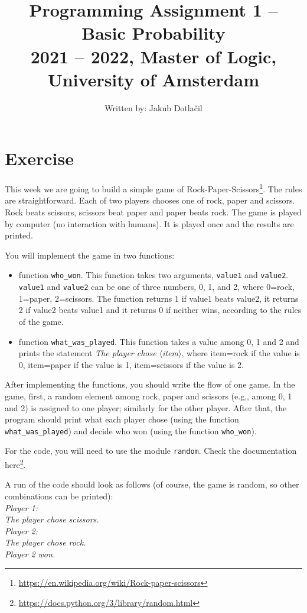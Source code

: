 \documentclass[11pt, a4paper]{article}
\title{Programming Assignment 1 -- Basic Probability\\[2mm]
\large{2021 -- 2022, Master of Logic, University of Amsterdam}}
\author{Written by: Jakub Dotla\v{c}il \\}
\newcommand{\angles}[1]{$\langle$#1$\rangle$}
\newcommand{\link}[1]{\footnote{\color{blue}\href{#1}{#1}}}
\begin{document}
\date{}\maketitle

\section{Exercise}
This week we are going to build a simple game of Rock-Paper-Scissors\link{https://en.wikipedia.org/wiki/Rock-paper-scissors}. The rules are straightforward. Each of two players chooses one of rock, paper and scissors. Rock beats scissors, scissors beat paper and paper beats rock. The game is played by computer (no interaction with humans). It is played once and the results are printed.

You will implement the game in two functions:
\begin{itemize}
    \item function \texttt{who\_won}. This function takes two arguments, \texttt{value1} and \texttt{value2}. \texttt{value1} and \texttt{value2} can be one of three numbers, 0, 1, and 2, where 0=rock, 1=paper, 2=scissors. The function returns 1 if value1 beats value2, it returns 2 if value2 beats value1 and it returns 0 if neither wins, according to the rules of the game.
    \item function \texttt{what\_was\_played}. This function takes a value among 0, 1 and 2 and prints the statement \textit{The player chose \angles{item}}, where item=rock if the value is 0, item=paper if the value is 1, item=scissors if the value is 2.
\end{itemize}

After implementing the functions, you should write the flow of one game. In the game, first, a random element among rock, paper and scissors (e.g., among 0, 1 and 2) is assigned to one player; similarly for the other player. After that, the program should print what each player chose (using the function \texttt{what\_was\_played}) and decide who won (using the function \texttt{who\_won}).

For the code, you will need to use the module \texttt{random}. Check the documentation here\link{https://docs.python.org/3/library/random.html}.

A run of the code should look as follows (of course, the game is random, so other combinations can be printed):\\
\noindent \textit{
Player 1:\\
The player chose scissors.\\
Player 2:\\
The player chose rock.\\
Player 2 won.}
\end{document}
